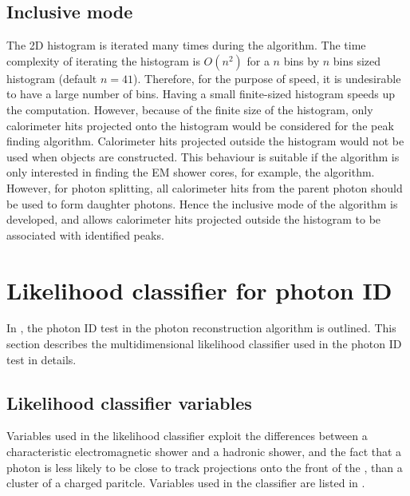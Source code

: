 \subsection{Inclusive mode}
\label{sec:photonPeakFindingInclusive}

The 2D histogram is iterated many times during the algorithm. The time complexity of iterating the histogram is $O(n^2)$ for a $n$ bins by  $n$ bins sized histogram (default $n = 41$). Therefore, for the purpose of speed, it is undesirable to have  a large number of bins. Having a small finite-sized histogram speeds up the computation. However, because of the finite size of the histogram, only  calorimeter hits  projected onto the histogram would be considered for the peak finding algorithm. Calorimeter hits projected outside the histogram would not be used when \ShowerPeak objects are constructed. This behaviour is suitable if the algorithm is only interested in finding the EM shower cores, for example, the \PhotonReconstruction algorithm. However, for photon splitting, all calorimeter hits from the parent photon should be used to form daughter photons. Hence the inclusive mode of the \peakFinding algorithm is developed, and allows calorimeter hits projected outside the histogram to be associated with identified peaks.


\section{Likelihood classifier for photon ID}
\label{sec:photonLikelihood}

In , the photon ID test in the photon reconstruction algorithm is outlined. This section describes the multidimensional likelihood classifier used in the photon ID test in details.


\subsection{Likelihood classifier variables}

Variables used in the likelihood classifier exploit the differences between a characteristic electromagnetic shower and a hadronic shower, and the fact that a photon is less likely to be close to track projections onto the front of the \ECAL, than a cluster of a charged paritcle. Variables used in the classifier are listed in .

